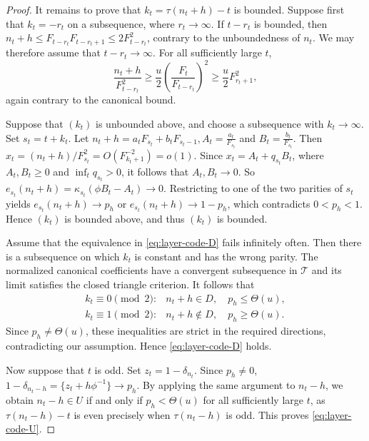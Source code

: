 \documentclass[11pt]{amsart}
\theoremstyle{definition}
\newcommand{\Tcal}{\mathcal T}
\begin{document}
\begin{proof}
It remains to prove that $k_t=\tau(n_t+h)-t$ is bounded. Suppose first that $k_t=-r_t$ on a subsequence, where $r_t\to\infty$. If $t-r_t$ is bounded, then $n_t+h\leq F_{t-r_t}F_{t-r_t+1}\leq2F_{t-r_t}^2$, contrary to the unboundedness of $n_t$. We may therefore assume that $t-r_t\to\infty$. For all sufficiently large $t$,
\[
\frac{n_t+h}{F_{t-r_t}^2}
\geq\frac{u}{2}\left(\frac{F_t}{F_{t-r_t}}\right)^2
\geq\frac{u}{2}F_{r_t+1}^2,
\]
again contrary to the canonical bound.

Suppose that $(k_t)$ is unbounded above, and choose a subsequence with $k_t\to\infty$. Set $s_t=t+k_t$. Let $n_t+h=a_tF_{s_t}+b_tF_{s_t-1}, A_t=\frac{a_t}{F_{s_t}}$ and $B_t=\frac{b_t}{F_{s_t}}$. Then $x_t=(n_t+h)/F_{s_t}^2=O\!\left(F_{k_t+1}^{-2}\right)=o(1)$. Since $x_t=A_t+q_{s_t}B_t$, where $A_t,B_t\geq0$ and $\inf_t q_{s_t}>0$, it follows that $A_t,B_t\to0$. So $e_{s_t}(n_t+h)=\kappa_{s_t}(\phi B_t-A_t)\longrightarrow0$. Restricting to one of the two parities of $s_t$ yields $e_{s_t}(n_t+h)\longrightarrow p_h$  or $e_{s_t}(n_t+h)\longrightarrow1-p_h$, which contradicts $0<p_h<1$. Hence $(k_t)$ is bounded above, and thus $(k_t)$ is bounded.

Assume that the equivalence in \eqref{eq:layer-code-D} fails infinitely often. Then there is a subsequence on which $k_t$ is constant and has the wrong
parity. The normalized canonical coefficients have a convergent subsequence in $\Tcal$ and its limit satisfies the closed triangle criterion. It follows that
\[
\begin{array}{ll}
k_t\equiv0\pmod2:& n_t+h\in D,\quad p_h\leq\Theta(u),\\
k_t\equiv1\pmod2:& n_t+h\notin D,\quad p_h\geq\Theta(u).
\end{array}
\]
Since $p_h\neq\Theta(u)$, these inequalities are strict in the required directions, contradicting our assumption. Hence \eqref{eq:layer-code-D} holds.

Now suppose that $t$ is odd. Set $z_t=1-\delta_{n_t}$. Since $p_h\neq0$, $1-\delta_{n_t-h}=\{z_t+h\phi^{-1}\}\longrightarrow p_h$. By applying the same argument to $n_t-h$, we obtain $n_t-h\in U$ if and only if $p_h<\Theta(u)$ for all sufficiently large $t$, as $\tau(n_t-h)-t$ is even precisely when $\tau(n_t-h)$ is odd. This proves \eqref{eq:layer-code-U}.
\end{proof}
\medskip
\end{document}
